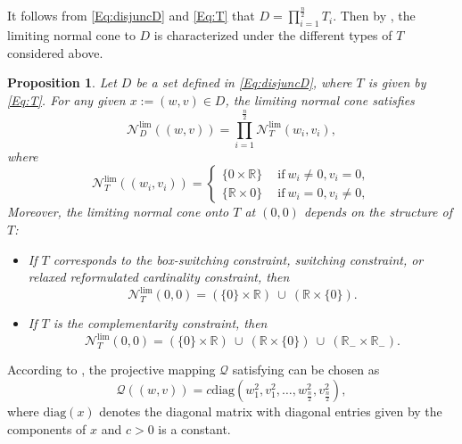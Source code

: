 \documentclass[11pt,a4paper,reqno]{amsart}
\newtheorem{proposition}[theorem]{Proposition}
\begin{document}
{ It follows from \eqref{Eq:disjuncD} and \eqref{Eq:T} that $D=\prod_{i=1}^{\frac{n}{2}}T_i$. Then by \cite[Proposition~6.41]{rockafellar1998variational}, the limiting normal cone to $D$ is characterized under the different types of $T$ considered above.
\begin{proposition}\label{Prop:disjlnc}
   Let $D$ be a set defined in \eqref{Eq:disjuncD}, where $T$ is given by \eqref{Eq:T}. For any given $x:=(w,v)\in D$, the limiting normal cone satisfies
    \begin{equation}
                  \mathcal N_D^{\text{lim}}((w,v))= \prod_{i=1}^{\frac{n}{2}} \mathcal N_T^{\text{lim}}(w_i,v_i),
    \end{equation}
    where
        \begin{equation}
        \mathcal N_{T}^{\text{lim}} ((w_i, v_i))=\begin{cases}
            \{0\times \mathbb R\} \quad \ \text{if}\ w_i \neq0, v_i=0,\\
            \{\mathbb R \times 0\} \quad \ \text{if}\ w_i=0, v_i\neq 0,
        \end{cases}
    \end{equation}
    Moreover, the limiting normal cone onto $T$ at $(0,0)$ depends on the structure of $T$:
\begin{itemize}
\item If $T$ corresponds to the box-switching constraint, switching constraint, or relaxed reformulated cardinality constraint, then
\begin{equation*}
\mathcal N_T^{\mathrm{lim}}(0,0)
= (\{0\}\times \mathbb R)\ \cup\ (\mathbb R \times \{0\}).
\end{equation*}

\item If $T$ is the complementarity constraint, then
\begin{equation*}
\mathcal N_T^{\mathrm{lim}}(0,0)
= (\{0\}\times \mathbb R)\ \cup\ (\mathbb R \times \{0\})\ \cup\ (\mathbb R_{-}\times \mathbb R_{-}).
\end{equation*}
\end{itemize}
\end{proposition}

According to , the projective mapping $\mathcal Q$ satisfying  can be chosen as
\begin{equation}\label{Eq:Qdisjunctive}
   \mathcal Q((w, v))=c\text{diag}\left(w^2_1, v^2_1, \ldots, w^2_{\frac{n}{2}}, v^2_{\frac{n}{2}}\right),
\end{equation}
where $\text{diag}(x)$ denotes the diagonal matrix with diagonal entries given by the components of $x$ and $c>0$ is a constant.

}
\end{document}
